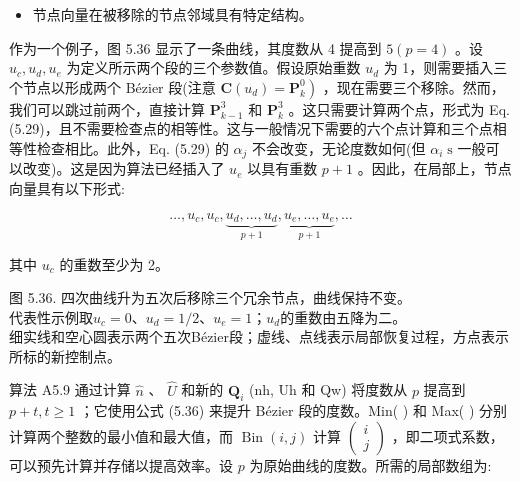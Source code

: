 \documentclass[../main.tex]{subfiles}
\begin{document}
\begin{itemize}
\item 节点向量在被移除的节点邻域具有特定结构。
\end{itemize}

作为一个例子，图 5.36 显示了一条曲线，其度数从 4 提高到 \(5\left( {p = 4}\right)\) 。设 \({u}_{c},{u}_{d},{u}_{e}\) 为定义所示两个段的三个参数值。假设原始重数 \({u}_{d}\) 为 1，则需要插入三个节点以形成两个 Bézier 段(注意 \(\left. {\mathbf{C}\left( {u}_{d}\right)  = {\mathbf{P}}_{k}^{0}}\right)\) ，现在需要三个移除。然而，我们可以跳过前两个，直接计算 \({\mathbf{P}}_{k - 1}^{3}\) 和 \({\mathbf{P}}_{k}^{3}\) 。这只需要计算两个点，形式为 Eq. (5.29)，且不需要检查点的相等性。这与一般情况下需要的六个点计算和三个点相等性检查相比。此外，Eq. (5.29) 的 \({\alpha }_{j}\) 不会改变，无论度数如何(但 \({\alpha }_{i}\mathrm{\;s}\) 一般可以改变)。这是因为算法已经插入了 \({u}_{e}\) 以具有重数 \(p + 1\) 。因此，在局部上，节点向量具有以下形式:

\[
\ldots ,{u}_{c},{u}_{c},\underset{p + 1}{\underbrace{{u}_{d},\ldots ,{u}_{d}}},\underset{p + 1}{\underbrace{{u}_{e},\ldots ,{u}_{e}}},\ldots
\]

其中 \({u}_{c}\) 的重数至少为 2。

\begin{center}
\begin{minipage}{18.8cm}
\vspace*{.6\baselineskip}
\centering
{}
\par\smallskip
图 5.36. 四次曲线升为五次后移除三个冗余节点，曲线保持不变。\\
代表性示例取$u_c=0$、$u_d=1/2$、$u_e=1$；$u_d$的重数由五降为二。\\
细实线和空心圆表示两个五次Bézier段；虚线、点线表示局部恢复过程，方点表示所标的新控制点。
\end{minipage}
\end{center}

算法 A5.9 通过计算 \(\widehat{n}\) 、 \(\widehat{U}\) 和新的 \({\mathbf{Q}}_{i}\) (nh, Uh 和 Qw) 将度数从 \(p\) 提高到 \(p + t,t \geq  1\) ；它使用公式 (5.36) 来提升 Bézier 段的度数。Min(   ) 和 Max(   ) 分别计算两个整数的最小值和最大值，而 \(\operatorname{Bin}\left( {i,j}\right)\) 计算 \(\left( \begin{array}{l} i \\  j \end{array}\right)\) ，即二项式系数，可以预先计算并存储以提高效率。设 \(p\) 为原始曲线的度数。所需的局部数组为:
\end{document}
